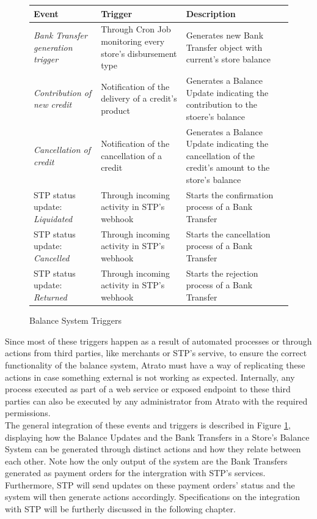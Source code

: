 \begin{figure}[H]
    \caption{Balance System Triggers}\label{fig:balance_system_triggers}
    \begin{tabularx}{1\textwidth} { 
    | >{\centering\arraybackslash}X 
    | >{\centering\arraybackslash}X 
    | >{\raggedright\arraybackslash}X | }
   \hline
   Event & Trigger & Description \\
   \hline
   \textit{Bank Transfer generation trigger} & Through Cron Job monitoring every store's disbursement type & Generates new Bank Transfer object with current's store balance  \\
   \hline
   \textit{Contribution of new credit} & Notification of the delivery of a credit's product & Generates a Balance Update indicating the contribution to the stoere's balance  \\
   \hline
   \textit{Cancellation of credit} & Notification of the cancellation of a credit & Generates a Balance Update indicating the cancellation of the credit's amount to the store's balance  \\
   \hline
   STP status update: \textit{Liquidated} & Through incoming activity in STP's webhook & Starts the confirmation process of a Bank Transfer   \\
   \hline
   STP status update: \textit{Cancelled} & Through incoming activity in STP's webhook & Starts the cancellation process of a Bank Transfer   \\
   \hline
   STP status update: \textit{Returned} & Through incoming activity in STP's webhook & Starts the rejection process of a Bank Transfer   \\
   \hline
\end{tabularx}
\end{figure}

    
Since most of these triggers happen as a result of automated processes or through actions from third parties, like merchants or STP's servive, to ensure the correct functionality of the balance system, Atrato must have a way of replicating these actions in case something external is not working as expected. Internally, any process executed as part of a web service or exposed endpoint to these third parties can also be executed by any administrator from Atrato with the required permissions.\\
    
The general integration of these events and triggers is described in Figure \ref{fig:balance_system_triggers}, displaying how the Balance Updates and the Bank Transfers in a Store's Balance System can be generated through distinct actions and how they relate between each other. Note how the only output of the system are the Bank Transfers generated as payment orders for the intergration with STP's services. Furthermore, STP will send updates on these payment orders' status and the system will then generate actions accordingly. Specifications on the integration with STP will be furtherly discussed in the following chapter.

